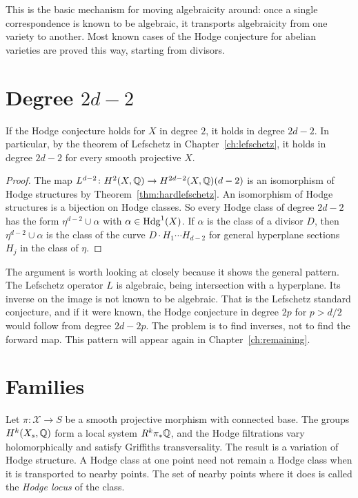 This is the basic mechanism for moving algebraicity around: once a single
correspondence is known to be algebraic, it transports algebraicity from
one variety to another. Most known cases of the Hodge conjecture for
abelian varieties are proved this way, starting from divisors.

\section{Degree \texorpdfstring{$2d-2$}{2d-2}}

\begin{corollary}\label{cor:degree2d-2}
If the Hodge conjecture holds for $X$ in degree $2$, it holds in degree
$2d-2$. In particular, by the theorem of Lefschetz in
Chapter~\ref{ch:lefschetz}, it holds in degree $2d-2$ for every smooth
projective $X$.
\end{corollary}

\begin{proof}
The map $L^{d-2}\colon H^{2}(X,\mathbb{Q})\to H^{2d-2}(X,\mathbb{Q})(d-2)$ is an
isomorphism of Hodge structures by Theorem~\ref{thm:hardlefschetz}. An
isomorphism of Hodge structures is a bijection on Hodge classes. So every
Hodge class of degree $2d-2$ has the form $\eta^{d-2}\cup\alpha$ with
$\alpha\in\operatorname{Hdg}^{1}(X)$. If $\alpha$ is the class of a divisor $D$, then
$\eta^{d-2}\cup\alpha$ is the class of the curve $D\cdot H_{1}\cdots
H_{d-2}$ for general hyperplane sections $H_{j}$ in the class of $\eta$.
\end{proof}

The argument is worth looking at closely because it shows the general
pattern. The Lefschetz operator $L$ is algebraic, being intersection with
a hyperplane. Its inverse on the image is not known to be algebraic. That
is the Lefschetz standard conjecture, and if it were known, the Hodge
conjecture in degree $2p$ for $p>d/2$ would follow from degree
$2d-2p$. The problem is to find inverses, not to find the forward map.
This pattern will appear again in Chapter~\ref{ch:remaining}.

\section{Families}\label{sec:families}

Let $\pi\colon\mathcal X\to S$ be a smooth projective morphism with connected
base. The groups $H^{k}(X_{s},\mathbb{Q})$ form a local system $R^{k}\pi_{*}\mathbb{Q}$, and
the Hodge filtrations vary holomorphically and satisfy Griffiths
transversality. The result is a variation of Hodge structure. A Hodge class
at one point need not remain a Hodge class when it is transported to
nearby points. The set of nearby points where it does is called the
\emph{Hodge locus} of the class.

